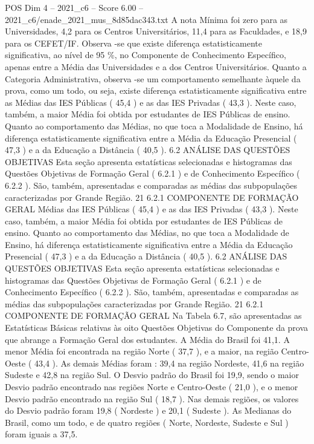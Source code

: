 \begin{textsample}{POS Dim 4 – 2021\_c6 – Score 6.00 – 2021\_c6/enade\_2021\_mus\_8d85dac343.txt}
A nota Mínima foi zero para as Universidades, 4,2 para os Centros Universitários, 11,4 para as Faculdades, e 18,9 para os CEFET/IF.
Observa -se que existe diferença estatisticamente significativa, ao nível de 95 \%, no Componente de Conhecimento Específico, apenas entre a Média das Universidades e a dos Centros Universitários.
Quanto a Categoria Administrativa, observa -se um comportamento semelhante àquele da prova, como um todo, ou seja, existe diferença estatisticamente significativa entre as Médias das IES Públicas ( 45,4 ) e as das IES Privadas ( 43,3 ).
Neste caso, também, a maior Média foi obtida por estudantes de IES Públicas de ensino.
Quanto ao comportamento das Médias, no que toca a Modalidade de Ensino, há diferença estatisticamente significativa entre a Média da Educação Presencial ( 47,3 ) e a da Educação a Distância ( 40,5 ). 6.2 ANÁLISE DAS QUESTÕES OBJETIVAS Esta seção apresenta estatísticas selecionadas e histogramas das Questões Objetivas de Formação Geral ( 6.2.1 ) e de Conhecimento Específico ( 6.2.2 ).
São, também, apresentadas e comparadas as médias das subpopulações caracterizadas por Grande Região. 21 6.2.1 COMPONENTE DE FORMAÇÃO GERAL Médias das IES Públicas ( 45,4 ) e as das IES Privadas ( 43,3 ).
Neste caso, também, a maior Média foi obtida por estudantes de IES Públicas de ensino.
Quanto ao comportamento das Médias, no que toca a Modalidade de Ensino, há diferença estatisticamente significativa entre a Média da Educação Presencial ( 47,3 ) e a da Educação a Distância ( 40,5 ). 6.2 ANÁLISE DAS QUESTÕES OBJETIVAS Esta seção apresenta estatísticas selecionadas e histogramas das Questões Objetivas de Formação Geral ( 6.2.1 ) e de Conhecimento Específico ( 6.2.2 ).
São, também, apresentadas e comparadas as médias das subpopulações caracterizadas por Grande Região. 21 6.2.1 COMPONENTE DE FORMAÇÃO GERAL Na Tabela 6.7, são apresentadas as Estatísticas Básicas relativas às oito Questões Objetivas do Componente da prova que abrange a Formação Geral dos estudantes.
A Média do Brasil foi 41,1.
A menor Média foi encontrada na região Norte ( 37,7 ), e a maior, na região Centro-Oeste ( 43,4 ).
As demais Médias foram : 39,4 na região Nordeste, 41,6 na região Sudeste e 42,8 na região Sul.
O Desvio padrão do Brasil foi 19,9, sendo o maior Desvio padrão encontrado nas regiões Norte e Centro-Oeste ( 21,0 ), e o menor Desvio padrão encontrado na região Sul ( 18,7 ).
Nas demais regiões, os valores do Desvio padrão foram 19,8 ( Nordeste ) e 20,1 ( Sudeste ).
As Medianas do Brasil, como um todo, e de quatro regiões ( Norte, Nordeste, Sudeste e Sul ) foram iguais a 37,5.

\end{textsample}
